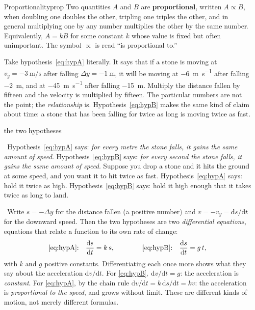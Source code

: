 \documentclass[11pt,twoside,openany]{book}
\newcommand{\dd}{\mathrm{d}}
\newcommand{\deriv}[2]{\frac{\dd #1}{\dd #2}}
\newcommand{\viewtag}[3]{\fcolorbox{#2}{#3}{\footnotesize\textbf{\textcolor{#2}{#1}}}}
\newcommand{\elemtag}{\viewtag{Elementary}{elemcol}{elempale}}
\newcommand{\calctag}{\viewtag{Calculus}{calccol}{calcpale}}
\newcommand{\elem}{\par\medskip\noindent\elemtag\ }
\newcommand{\calc}{\par\medskip\noindent\calctag\ }
\begin{document}
\begin{definition}{Proportionality}{prop}
Two quantities $A$ and $B$ are \textbf{proportional}, written $A \propto B$, when doubling one doubles the other, tripling one triples the other, and in general multiplying one by any number multiplies the other by the same number. Equivalently, $A = kB$ for some constant $k$ whose value is fixed but often unimportant. The symbol $\propto$ is read ``is proportional to.''
\end{definition}

Take hypothesis~\eqref{eq:hypA} literally. It says that if a stone is moving at $v_y = \SI{-3}{\metre\per\second}$ after falling $\Delta y = \SI{-1}{\metre}$, it will be moving at \SI{-6}{\metre\per\second} after falling \SI{-2}{\metre}, and at \SI{-45}{\metre\per\second} after falling \SI{-15}{\metre}. Multiply the distance fallen by fifteen and the velocity is multiplied by fifteen. The particular numbers are not the point; the \emph{relationship} is. Hypothesis~\eqref{eq:hypB} makes the same kind of claim about time: a stone that has been falling for twice as long is moving twice as fast.

\begin{twoviews}{the two hypotheses}
\elem Hypothesis~\eqref{eq:hypA} says: \emph{for every metre the stone falls, it gains the same amount of speed.} Hypothesis~\eqref{eq:hypB} says: \emph{for every second the stone falls, it gains the same amount of speed.} Suppose you drop a stone and it hits the ground at some speed, and you want it to hit twice as fast. Hypothesis~\eqref{eq:hypA} says: hold it twice as high. Hypothesis~\eqref{eq:hypB} says: hold it high enough that it takes twice as long to land.

\calc Write $s = -\Delta y$ for the distance fallen (a positive number) and $v = -v_y = \dd s/\dd t$ for the downward speed. Then the two hypotheses are two \emph{differential equations}, equations that relate a function to its own rate of change:
\[
\text{\eqref{eq:hypA}:}\quad \deriv{s}{t} = k\,s, \qquad\qquad \text{\eqref{eq:hypB}:}\quad \deriv{s}{t} = g\,t,
\]
with $k$ and $g$ positive constants. Differentiating each once more shows what they say about the acceleration $\dd v/\dd t$. For \eqref{eq:hypB}, $\dd v/\dd t = g$: the acceleration is \emph{constant}. For \eqref{eq:hypA}, by the chain rule $\dd v/\dd t = k\,\dd s/\dd t = k v$: the acceleration is \emph{proportional to the speed}, and grows without limit. These are different kinds of motion, not merely different formulas.
\end{twoviews}
\end{document}

